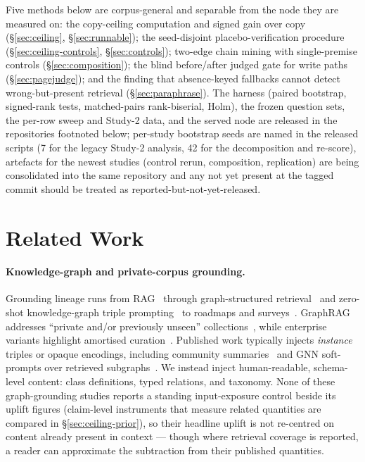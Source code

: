 \documentclass[10pt,twocolumn]{article}
\begin{document}
Five methods below are corpus-general and separable from the node they are measured on: the copy-ceiling computation and signed gain over copy (\S\ref{sec:ceiling}, \S\ref{sec:runnable}); the seed-disjoint placebo-verification procedure (\S\ref{sec:ceiling-controls}, \S\ref{sec:controls}); two-edge chain mining with single-premise controls (\S\ref{sec:composition}); the blind before/after judged gate for write paths (\S\ref{sec:pagejudge}); and the finding that absence-keyed fallbacks cannot detect wrong-but-present retrieval (\S\ref{sec:paraphrase}). The harness (paired bootstrap, signed-rank tests, matched-pairs rank-biserial, Holm), the frozen question sets, the per-row sweep and Study-2 data, and the served node are released in the repositories footnoted below; per-study bootstrap seeds are named in the released scripts (7 for the legacy Study-2 analysis, 42 for the decomposition and re-score), artefacts for the newest studies (control rerun, composition, replication) are being consolidated into the same repository and any not yet present at the tagged commit should be treated as reported-but-not-yet-released.


\section{Related Work}\label{sec:related}
\paragraph{Knowledge-graph and private-corpus grounding.}
Grounding lineage runs from RAG~\cite{lewis2020rag} through graph-structured retrieval~\cite{edge2024graphrag,guo2024lightrag} and zero-shot knowledge-graph triple prompting~\cite{baek2023kaping} to roadmaps and surveys~\cite{pan2024unifying,peng2024graphragsurvey}. GraphRAG addresses ``private and/or previously unseen'' collections~\cite{edge2024graphrag}, while enterprise variants highlight amortised curation~\cite{min2025practicalgraphrag}. Published work typically injects \emph{instance} triples or opaque encodings, including community summaries~\cite{edge2024graphrag} and GNN soft-prompts over retrieved subgraphs~\cite{he2024gretriever}. We instead inject human-readable, schema-level content: class definitions, typed relations, and taxonomy. None of these graph-grounding studies reports a standing input-exposure control beside its uplift figures (claim-level instruments that measure related quantities are compared in \S\ref{sec:ceiling-prior}), so their headline uplift is not re-centred on content already present in context --- though where retrieval coverage is reported, a reader can approximate the subtraction from their published quantities.
\end{document}
